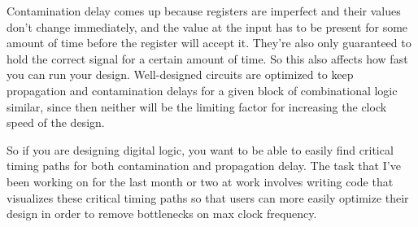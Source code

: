 \documentclass[12pt]{article}
\begin{document}
Contamination delay comes up because registers are imperfect and their values don't change immediately, and the value at the input has to be present for some amount of time before the register will accept it.
They're also only guaranteed to hold the correct signal for a certain amount of time.
So this also affects how fast you can run your design.
Well-designed circuits are optimized to keep propagation and contamination delays for a given block of combinational logic similar, since then neither will be the limiting factor for increasing the clock speed of the design.

So if you are designing digital logic, you want to be able to easily find critical timing paths for both contamination and propagation delay.
The task that I've been working on for the last month or two at work involves writing code that visualizes these critical timing paths so that users can more easily optimize their design in order to remove bottlenecks on max clock frequency.
\end{document}
